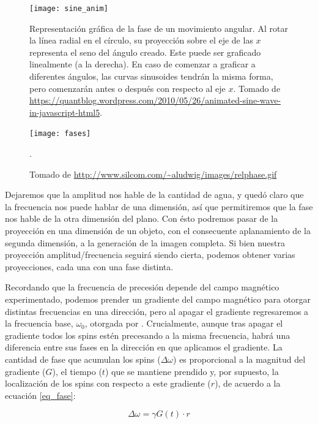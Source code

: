 \begin{figure}[htb]
 \begin{figg}
   \texttt{[image: sine\_anim]}
   \caption{Representación gráfica de la fase de un movimiento angular. Al rotar la línea radial en el círculo, su proyección sobre el eje de las $x$ representa el seno del ángulo creado. Este puede ser graficado linealmente (a la derecha). En caso de comenzar a graficar a diferentes ángulos, las curvas sinusoides tendrán la misma forma, pero comenzarán antes o después con respecto al eje $x$. Tomado de \url{https://quantblog.wordpress.com/2010/05/26/animated-sine-wave-in-javascript-html5}.}
 \label{fig:sine_anim}
 \end{figg}
\end{figure}

\begin{figure}[htb]
 \begin{figg}
   \texttt{[image: fases]}
   \caption{Tomado de \url{http://www.silcom.com/~aludwig/images/relphase.gif}}.
 \label{fig:fases}
 \end{figg}
\end{figure}

Dejaremos que la amplitud nos hable de la cantidad de agua, y quedó claro que la frecuencia nos puede hablar de una dimensión, así que permitiremos que la fase nos hable de la otra dimensión del plano. Con ésto podremos pasar de la proyección en una dimensión de un objeto, con el consecuente aplanamiento de la segunda dimensión, a la generación de la imagen completa. Si bien nuestra proyección amplitud/frecuencia seguirá siendo cierta, podemos obtener varias proyecciones, cada una con una fase distinta. 

Recordando que la frecuencia de precesión depende del campo magnético experimentado, podemos prender un gradiente del campo magnético  para otorgar distintas frecuencias en una dirección, pero al apagar el gradiente regresaremos a la frecuencia base, $\omega_0$, otorgada por \Bzero. Crucialmente, aunque tras apagar el gradiente todos los spins estén precesando a la misma frecuencia, habrá una diferencia entre sus fases en la dirección en que aplicamos el gradiente. La cantidad de fase que acumulan los spins ($\Delta\omega$) es proporcional a la magnitud del gradiente ($G$),  el tiempo ($t$) que se mantiene prendido y, por supuesto, la localización de los spins con respecto a este gradiente ($r$), de acuerdo a la ecuación \ref{eq_fase}:

\begin{equation}
 \Delta\omega = \gamma G(t) \cdot r
 \label{eq_fase}
\end{equation}


